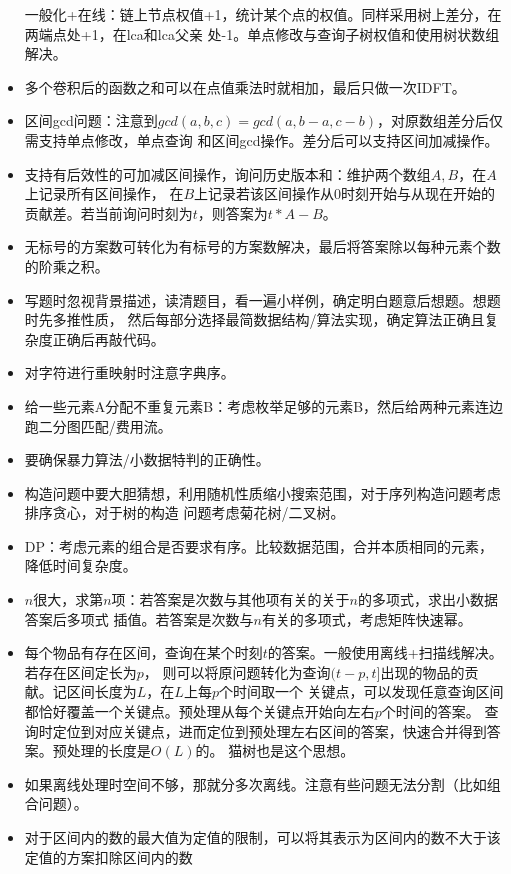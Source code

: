 \begin{itemize}
	一般化+在线：链上节点权值+1，统计某个点的权值。同样采用树上差分，在两端点处+1，在lca和lca父亲
	处-1。单点修改与查询子树权值和使用树状数组解决。
	\item 多个卷积后的函数之和可以在点值乘法时就相加，最后只做一次IDFT。
	\item 区间gcd问题：注意到$gcd(a,b,c)=gcd(a,b-a,c-b)$，对原数组差分后仅需支持单点修改，单点查询
	和区间gcd操作。差分后可以支持区间加减操作。
	\item 支持有后效性的可加减区间操作，询问历史版本和：维护两个数组$A,B$，在$A$上记录所有区间操作，
	在$B$上记录若该区间操作从0时刻开始与从现在开始的贡献差。若当前询问时刻为$t$，则答案为$t*A-B$。
	\label{HistorySum}
	\item 无标号的方案数可转化为有标号的方案数解决，最后将答案除以每种元素个数的阶乘之积。
	\item 写题时忽视背景描述，读清题目，看一遍小样例，确定明白题意后想题。想题时先多推性质，
	然后每部分选择最简数据结构/算法实现，确定算法正确且复杂度正确后再敲代码。
	\item 对字符进行重映射时注意字典序。
	\item 给一些元素A分配不重复元素B：考虑枚举足够的元素B，然后给两种元素连边跑二分图匹配/费用流。
	\item 要确保暴力算法/小数据特判的正确性。
	\item 构造问题中要大胆猜想，利用随机性质缩小搜索范围，对于序列构造问题考虑排序贪心，对于树的构造
	问题考虑菊花树/二叉树。
	\item DP：考虑元素的组合是否要求有序。比较数据范围，合并本质相同的元素，降低时间复杂度。
	\item $n$很大，求第$n$项：若答案是次数与其他项有关的关于$n$的多项式，求出小数据答案后多项式
	插值。若答案是次数与$n$有关的多项式，考虑矩阵快速幂。
	\item 每个物品有存在区间，查询在某个时刻$t$的答案。一般使用离线+扫描线解决。若存在区间定长为$p$，
	则可以将原问题转化为查询$(t-p,t]$出现的物品的贡献。记区间长度为$L$，在$L$上每$p$个时间取一个
	关键点，可以发现任意查询区间都恰好覆盖一个关键点。预处理从每个关键点开始向左右$p$个时间的答案。
	查询时定位到对应关键点，进而定位到预处理左右区间的答案，快速合并得到答案。预处理的长度是$O(L)$的。
	猫树也是这个思想。
	\item 如果离线处理时空间不够，那就分多次离线。注意有些问题无法分割（比如组合问题）。
	\item 对于区间内的数的最大值为定值的限制，可以将其表示为区间内的数不大于该定值的方案扣除区间内的数

\end{itemize}
